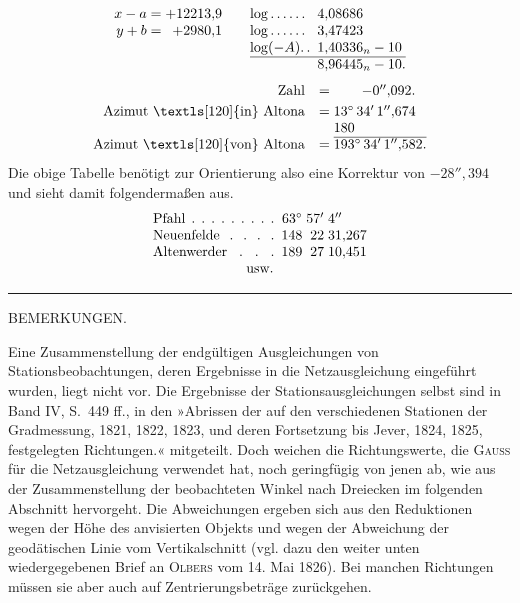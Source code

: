 \[
\begin{array}{@{}r@{\;=\;}r@{\qquad}l@{\enspace}l@{}}
 x-a&+12213{,}9&\log.\,.\,.\,.\,.\,.&4{,}08686\\
 y+b&+2980{,}1&\log.\,.\,.\,.\,.\,.&3{,}47423\\
 \multicolumn{2}{c}{}&\log(-A).\, .&1{,}40336_n-10\\
 \cline{3-4}
 \multicolumn{2}{c}{}&&8{,}96445_n-10.
\end{array}
\]
\[
\begin{array}{@{}r@{\quad}c@{\;}l@{}}
 \text{Zahl}&=&\qquad-0''{,}092.\\[3pt]
 \text{Azimut \textls[120]{in} Altona}&=&13^\circ\,34'\,1''{,}674\\
 &&180\\
 \cline{3-3}
 \text{Azimut \textls[120]{von} Altona}&=&193^\circ\,34'\,1''{,}582.
\end{array}
\]
\indent Die obige Tabelle benötigt zur Orientierung also eine Korrektur von \(-28''{,}394\) und sieht damit folgendermaßen aus.
\[
\begin{array}{@{}l@{\enspace}r@{\;}r@{\;}l@{}}
 \text{\hbox to 8.7em{Pfahl\hfil.\hfil.\hfil.\hfil.\hfil.\hfil.\hfil.\hfil.\hfil.}}&63^\circ&57'&4''\\
 \text{\hbox to 8.7em{Neuenfelde\hfil.\hfil.\hfil.\hfil.}}&148&22&31{,}267\\
 \text{\hbox to 8.7em{Altenwerder\hfil.\hfil.\hfil.}}&189&27&10{,}451\\
 \multicolumn{4}{c}{\text{usw.}}
\end{array}
\]

\begin{center}\rule{3cm}{.4pt}\end{center}
\vspace{.8cm}
\begingroup\small
\begin{center}
 BEMERKUNGEN.
\end{center}

Eine Zusammenstellung der endgültigen Ausgleichungen von Stationsbeobachtungen, deren Ergebnisse in die Netzausgleichung eingeführt wurden, liegt nicht vor. Die Ergebnisse der Stationsausgleichungen selbst sind in Band IV, S.~449 ff., in den »Abrissen der auf den verschiedenen Stationen der Gradmessung, 1821, 1822, 1823, und deren Fortsetzung bis Jever, 1824, 1825, festgelegten Richtungen.« mitgeteilt. Doch weichen die Richtungswerte, die \textsc{Gauss} für die Netzausgleichung verwendet hat, noch geringfügig von jenen ab, wie aus der Zusammenstellung der beobachteten Winkel nach Dreiecken im folgenden Abschnitt hervorgeht. Die Abweichungen ergeben sich aus den Reduktionen wegen der Höhe des anvisierten Objekts und wegen der Abweichung der geodätischen Linie vom Vertikalschnitt (vgl. dazu den weiter unten wiedergegebenen Brief an \textsc{Olbers} vom 14. Mai 1826). Bei manchen Richtungen müssen sie aber auch auf Zentrierungsbeträge zurückgehen.

